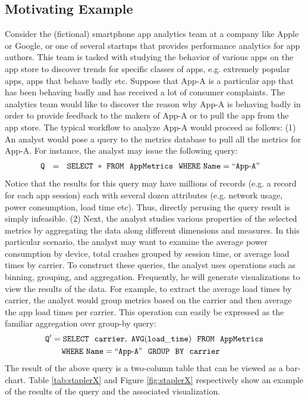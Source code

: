 \subsection*{Motivating Example}
Consider the (fictional) smartphone app analytics team at a company like Apple or Google,
or one of several startups that provides performance analytics for app authors.
This team is tasked with studying the behavior of various apps on the
app store to discover trends for specific classes of apps, e.g.
extremely popular apps, apps that behave badly etc.
Suppose that App-A is a particular app that has been behaving badly and has
received a lot of consumer complaints. 
The analytics team would like to discover the reason why App-A is
behaving badly in order to provide feedback to the makers of App-A or to pull
the app from the app store.
The typical workflow to analyze App-A would proceed as follows:
(1) An analyst would pose a query to the metrics database to pull all the
metrics for App-A.
For instance, the analyst may issue the following query:
\noindent 
\begin{align*}
& \tt Q \ \ = \ \ SELECT \ * \ FROM \ \  AppMetrics \ \ WHERE  \ Name=``App\text{-}A"
\end{align*}
Notice that the results for this query may have millions of records
(e.g. a record for each app session) each with several dozen attributes (e.g.
network usage, power consumption, load time etc).
Thus, directly perusing the query result is simply infeasible.
(2) Next, the analyst studies various properties of the selected metrics by
aggregating the data along different dimensions and measures. 
In this particular scenario, the analyst may want to examine the average power
consumption by device, total crashes grouped by session time, or average load
times by carrier.
To construct these queries, the analyst uses operations such as binning,
grouping, and aggregation.  Frequently, he will generate visualizations to view
the results of the data.
For example, to extract the average load times by carrier, the
analyst would group metrics based on the carrier and then average the app load
times per carrier.
This operation can easily be expressed as the familiar aggregation over group-by
query:
\noindent
\begin{align*}
& \tt Q' = SELECT \ \ carrier,\ AVG(load\_time) \ \ FROM \ \  AppMetrics \\
& \tt \hspace{20pt} WHERE\ Name=``App\text{-}A" \ \ GROUP  \ \ BY \ \ carrier
\end{align*}
The result of the above query is a two-column table that can  be viewed
as a bar-chart. Table \ref{tab:staplerX} and Figure
\ref{fig:staplerX} respectively show an example of the results of the query and
the associated visualization.

